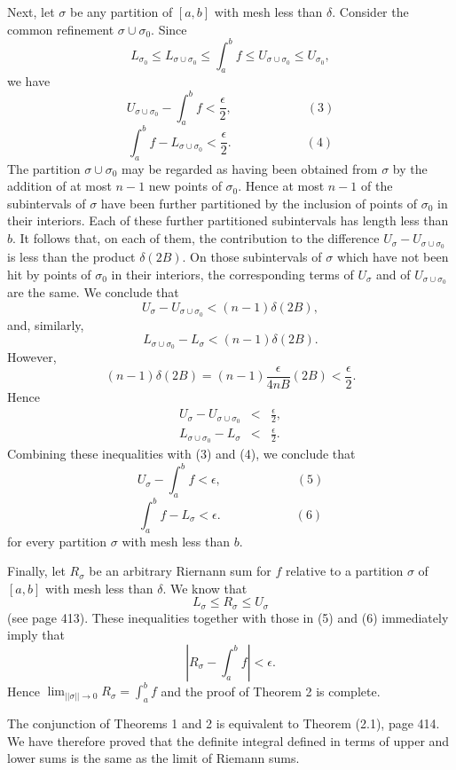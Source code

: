 Next, let $\sigma$ be any partition of $[a, b]$ with mesh less than $\delta$. Consider the common refinement $\sigma \cup \sigma_0$. Since
$$
L_{\sigma_0} \leq L_{\sigma \cup \sigma_0} \leq \int_a^b f \leq U_{\sigma \cup \sigma_0} \leq U_{\sigma_0}  , 
$$
we have
$$
U_{\sigma \cup \sigma_0} - \int_a^b f < \frac{\epsilon}{2} , \hspace{1in}( 3 )
$$
$$
\int_a^b f - L_{\sigma \cup \sigma_0} < \frac{\epsilon}{2} . \hspace{1in}( 4 )
$$
The partition $\sigma \cup \sigma_0$ may be regarded as having been obtained from $\sigma$ by the addition of at most $n - 1$ new points of $\sigma_0$. Hence at most $n - 1$ of the subintervals of $\sigma$ have been further partitioned by the inclusion of points of $\sigma_0$ in their interiors. Each of these further partitioned subintervals has length less than $b$. It follows that, on each of them, the contribution to the difference $U_\sigma - U_{\sigma \cup \sigma_0}$ is less than the product $\delta (2B)$. On those subintervals of $\sigma$ which have not been hit by points of $\sigma_0$ in their interiors, the corresponding terms of $U_\sigma$ and of $U_{\sigma \cup \sigma_0}$ are the same. We conclude that
$$
U_\sigma - U_{\sigma \cup \sigma_0} < (n - 1) \delta (2B), 
$$
and, similarly,
$$
L_{\sigma \cup \sigma_0} - L_\sigma < (n - 1) \delta (2B).
$$
However,
$$
(n - 1) \delta (2B) = (n - 1)\frac{\epsilon}{4nB} (2B) < \frac{\epsilon}{2} .
$$
Hence
\begin{eqnarray*}
U_\sigma - U_{\sigma \cup \sigma_0} &<& \frac{\epsilon}{2} ,\\
L_{\sigma \cup \sigma_0} - L_\sigma &<& \frac{\epsilon}{2} .
\end{eqnarray*}
Combining these inequalities with (3) and (4), we conclude that
$$
U_\sigma - \int_a^b f < \epsilon, \hspace{1in}( 5 )  
$$
$$
\int_a^b f - L_\sigma < \epsilon.\hspace{1in} ( 6 )
$$
for every partition $\sigma$ with mesh less than $b$.

Finally, let $R_\sigma$ be an arbitrary Riernann sum for $f$ relative to a partition $\sigma$ of $[a, b]$ with mesh less than $\delta$. We know that
$$
L_\sigma \leq R_\sigma \leq U_\sigma 
$$
(see page 413). These inequalities together with those in (5) and (6) immediately imply that
$$
|R_\sigma - \int_a^b f| < \epsilon .
$$
Hence $\lim_{||\sigma|| \rightarrow 0} R_\sigma = \int_a^b f$ and the proof of Theorem 2 is complete.  

The conjunction of Theorems 1 and 2 is equivalent to Theorem (2.1), page 414. We have therefore proved that the definite integral defined in terms of upper and lower sums is the same as the limit of Riemann sums.
